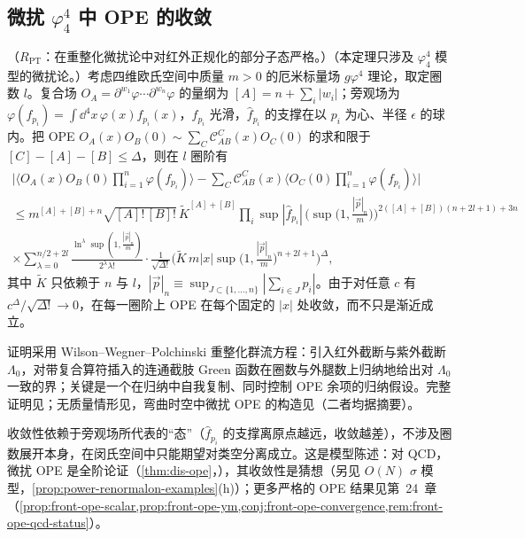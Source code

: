 \subsection{微扰 \texorpdfstring{$\varphi^4_4$}{phi4} 中 OPE 的收敛}

\begin{theorem}\label{thm:power-ope-convergence}
（$R_{\mathrm{PT}}$：在重整化微扰论中对红外正规化的部分子态严格。）（本定理只涉及 $\varphi^4_4$ 模型的微扰论。）考虑四维欧氏空间中质量 $m>0$ 的厄米标量场 $g\varphi^4$ 理论，取定圈数 $l$。复合场 $O_A=\partial^{w_1}\varphi\cdots\partial^{w_n}\varphi$ 的量纲为 $[A]=n+\sum_i|w_i|$；旁观场为 $\varphi(f_{p_i})=\int\dd^4x\,\varphi(x)f_{p_i}(x)$，$f_{p_i}$ 光滑，$\hat f_{p_i}$ 的支撑在以 $p_i$ 为心、半径 $\epsilon$ 的球内。把 OPE $O_A(x)O_B(0)\sim\sum_C\mathcal C^C_{AB}(x)O_C(0)$ 的求和限于 $[C]-[A]-[B]\le\Delta$，则在 $l$ 圈阶有
\begin{multline}\label{eq:power-hk}
\Big|\Big\langle O_A(x)O_B(0)\prod_{i=1}^n\varphi(f_{p_i})\Big\rangle-\sum_C\mathcal C^C_{AB}(x)\Big\langle O_C(0)\prod_{i=1}^n\varphi(f_{p_i})\Big\rangle\Big|\\
\le m^{[A]+[B]+n}\sqrt{[A]!\,[B]!}\,\tilde K^{[A]+[B]}\prod_i\sup|\hat f_{p_i}|\,\Big(\sup\big(1,\tfrac{|\vec p|_n}{m}\big)\Big)^{2([A]+[B])(n+2l+1)+3n}\\
\times\sum_{\lambda=0}^{n/2+2l}\frac{\ln^\lambda\sup(1,\frac{|\vec p|_n}{m})}{2^\lambda\lambda!}\cdot\frac{1}{\sqrt{\Delta!}}\Big(\tilde K\,m|x|\sup\big(1,\tfrac{|\vec p|_n}{m}\big)^{n+2l+1}\Big)^{\Delta},
\end{multline}
其中 $\tilde K$ 只依赖于 $n$ 与 $l$，$|\vec p|_n\equiv\sup_{J\subset\{1,\dots,n\}}|\sum_{i\in J}p_i|$\cite[定理~3]{Hollands:2011gf}。由于对任意 $c$ 有 $c^\Delta/\sqrt{\Delta!}\to0$，在每一圈阶上 OPE 在每个固定的 $|x|$ 处收敛，而不只是渐近成立。
\end{theorem}

\begin{proofsketch}
证明\cite{Hollands:2011gf}采用 Wilson--Wegner--Polchinski 重整化群流方程：引入红外截断与紫外截断 $\Lambda_0$，对带复合算符插入的连通截肢 Green 函数在圈数与外腿数上归纳地给出对 $\Lambda_0$ 一致的界；关键是一个在归纳中自我复制、同时控制 OPE 余项的归纳假设。完整证明见\cite[定理~3 及其证明]{Hollands:2011gf}；无质量情形见\cite{Holland:2014pna}，弯曲时空中微扰 OPE 的构造见\cite{Hollands:2006ag}（二者均据摘要）。
\end{proofsketch}

收敛性依赖于旁观场所代表的“态”（$\hat f_{p_i}$ 的支撑离原点越远，收敛越差），不涉及圈数展开本身，在闵氏空间中只能期望对类空分离成立\cite{Hollands:2011gf}。这是模型陈述：对 QCD，微扰 OPE 是全阶论证（\cref{thm:dis-ope}，\tagA），其收敛性是猜想（另见 $O(N)$ $\sigma$ 模型，\cref{prop:power-renormalon-examples}(h)）；更多严格的 OPE 结果见第~24~章（\cref{prop:front-ope-scalar,prop:front-ope-ym,conj:front-ope-convergence,rem:front-ope-qcd-status}）。


